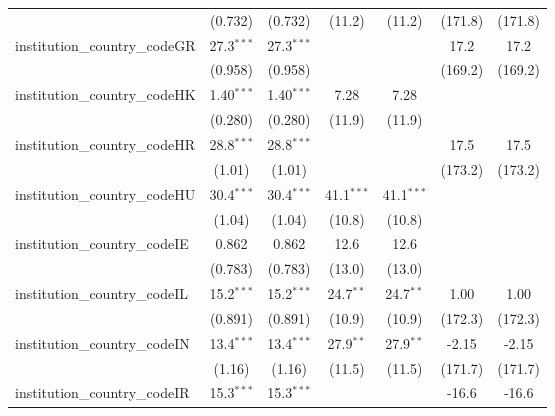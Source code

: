 \begin{tabular}{lcccccc}
                                         & (0.732)       & (0.732)       & (11.2)        & (11.2)        & (171.8)       & (171.8)\\   
   institution\_country\_codeGR          & 27.3$^{***}$  & 27.3$^{***}$  &               &               & 17.2          & 17.2\\   
                                         & (0.958)       & (0.958)       &               &               & (169.2)       & (169.2)\\   
   institution\_country\_codeHK          & 1.40$^{***}$  & 1.40$^{***}$  & 7.28          & 7.28          &               &   \\   
                                         & (0.280)       & (0.280)       & (11.9)        & (11.9)        &               &   \\   
   institution\_country\_codeHR          & 28.8$^{***}$  & 28.8$^{***}$  &               &               & 17.5          & 17.5\\   
                                         & (1.01)        & (1.01)        &               &               & (173.2)       & (173.2)\\   
   institution\_country\_codeHU          & 30.4$^{***}$  & 30.4$^{***}$  & 41.1$^{***}$  & 41.1$^{***}$  &               &   \\   
                                         & (1.04)        & (1.04)        & (10.8)        & (10.8)        &               &   \\   
   institution\_country\_codeIE          & 0.862         & 0.862         & 12.6          & 12.6          &               &   \\   
                                         & (0.783)       & (0.783)       & (13.0)        & (13.0)        &               &   \\   
   institution\_country\_codeIL          & 15.2$^{***}$  & 15.2$^{***}$  & 24.7$^{**}$   & 24.7$^{**}$   & 1.00          & 1.00\\   
                                         & (0.891)       & (0.891)       & (10.9)        & (10.9)        & (172.3)       & (172.3)\\   
   institution\_country\_codeIN          & 13.4$^{***}$  & 13.4$^{***}$  & 27.9$^{**}$   & 27.9$^{**}$   & -2.15         & -2.15\\   
                                         & (1.16)        & (1.16)        & (11.5)        & (11.5)        & (171.7)       & (171.7)\\   
   institution\_country\_codeIR          & 15.3$^{***}$  & 15.3$^{***}$  &               &               & -16.6         & -16.6\\   

\end{tabular}
